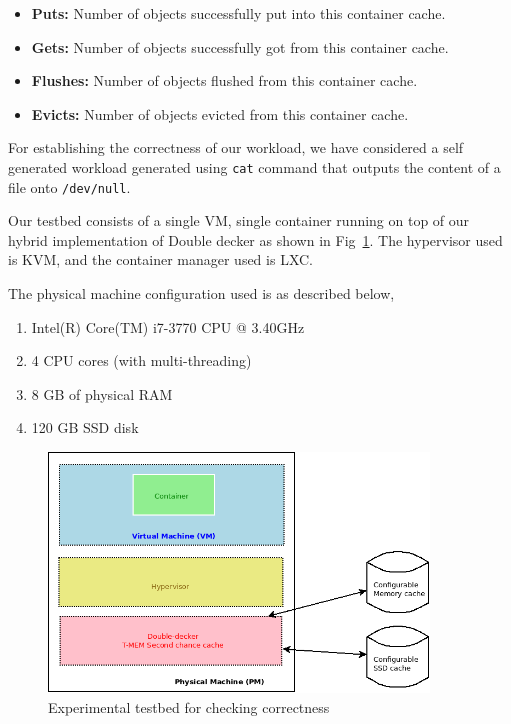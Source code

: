 	  \begin{itemize}
	   
	   \item \textbf{Puts:} Number of objects successfully put into this container cache.
	   \item \textbf{Gets:} Number of objects successfully got from this container cache.
	   \item \textbf{Flushes:} Number of objects flushed from this container cache.
	   \item \textbf{Evicts:} Number of objects evicted from this container cache.
	   
	  \end{itemize}	  
	  
	
	For establishing the correctness of our workload, we have considered a self generated workload generated using \texttt{cat} command 
	that outputs the content of a file onto \texttt{/dev/null}.
	
	Our testbed consists of a single VM, single container running on top of our hybrid implementation of Double decker as shown 
	in Fig~\ref{img_correctness_testbed}. The hypervisor used is KVM, and the container manager used is LXC.  
	
	
	\noindent The physical machine configuration used is as described below,
	  \begin{enumerate}
	   \item Intel(R) Core(TM) i7-3770 CPU @ 3.40GHz
	   \item 4 CPU cores (with multi-threading)
	   \item 8 GB of physical RAM
	   \item 120 GB SSD disk
	  \end{enumerate}

	
	\begin{figure}
	  \centering
	  \includegraphics[width=0.9\textwidth]{images/correctness/exp_setup.png}
	  \caption{Experimental testbed for checking correctness}
	  \label{img_correctness_testbed}
	\end{figure}
  
